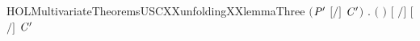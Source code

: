 \begin{SaveVerbatim}{HOLMultivariateTheoremsUSCXXunfoldingXXlemmaThree}
               \ensuremath{(}\ensuremath{\HOLBoundVar{P}\sp{\prime}} \HOLSymConst{\ensuremath{=}} \ensuremath{[}\ensuremath{/}\ensuremath{]} \ensuremath{\HOLBoundVar{C}\sp{\prime}}\ensuremath{)} \HOLSymConst{\HOLTokenConj{}}
               \HOLSymConst{\HOLTokenForall{}}.
                   \ensuremath{(}  \HOLSymConst{\ensuremath{=}}  \ensuremath{)} \HOLSymConst{\HOLTokenImp{}}
                   \ensuremath{[} \ensuremath{/}\ensuremath{]}  \HOLTokenTransBegin{}\HOLTokenTransEnd \ensuremath{[}\ensuremath{/}\ensuremath{]} \ensuremath{\HOLBoundVar{C}\sp{\prime}}
\end{SaveVerbatim}
\newcommand{\HOLMultivariateTheoremsUSCXXunfoldingXXlemmaThree}{\UseVerbatim{HOLMultivariateTheoremsUSCXXunfoldingXXlemmaThree}}
